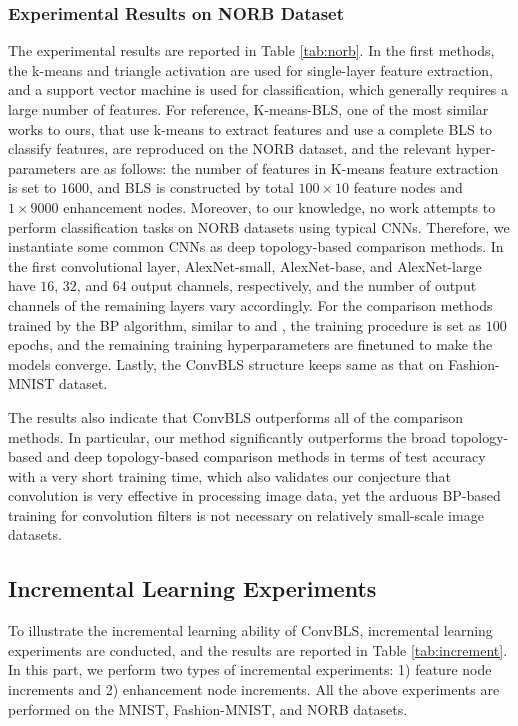 \documentclass[lettersize,journal]{IEEEtran}
\begin{document}
\subsubsection{Experimental Results on NORB Dataset}
The experimental results are reported in Table \ref{tab:norb}. In the first methods, the k-means and triangle activation are used for single-layer feature extraction, and a support vector machine is used for classification, which generally requires a large number of features.
For reference, K-means-BLS, one of the most similar works to ours, that use k-means to extract features and use a complete BLS to classify features, are reproduced on the NORB dataset, and the relevant hyper-parameters are as follows: the number of features in K-means feature extraction is set to $1600$, and BLS is constructed by total $100 \times 10$ feature nodes and $1 \times 9000$ enhancement nodes. Moreover, to our knowledge, no work attempts to perform classification tasks on NORB datasets using typical CNNs. Therefore, we instantiate some common CNNs as deep topology-based comparison methods. In the first convolutional layer, AlexNet-small, AlexNet-base, and AlexNet-large have $16$, $32$, and $64$ output channels, respectively, and the number of output channels of the remaining layers vary accordingly. For the comparison methods trained by the BP algorithm, similar to \cite{tang2015extreme} and \cite{chen2017broad}, the training procedure is set as $100$ epochs, and the remaining training hyperparameters are finetuned to make the models converge. Lastly, the ConvBLS structure keeps same as that on Fashion-MNIST dataset.
 
The results also indicate that ConvBLS outperforms all of the comparison methods.
In particular, our method significantly outperforms the broad topology-based and deep topology-based comparison methods in terms of test accuracy with a very short training time, which also validates our conjecture that convolution is very effective in processing image data, yet the arduous BP-based training for convolution filters is not necessary on relatively small-scale image datasets.

\subsection{Incremental Learning Experiments}
To illustrate the incremental learning ability of ConvBLS, incremental learning experiments are conducted, and the results are reported in Table \ref{tab:increment}. In this part, we perform two types of incremental experiments: 1) feature node increments and 2) enhancement node increments. All the above experiments are performed on the MNIST, Fashion-MNIST, and NORB datasets. 
\end{document}
